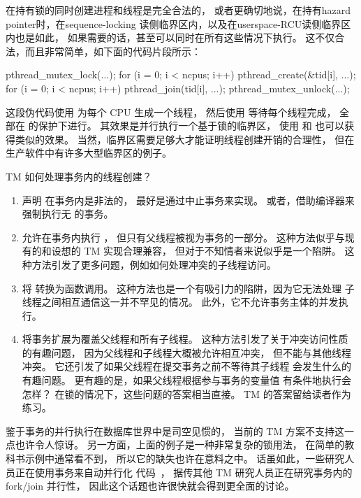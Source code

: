 在持有锁的同时创建进程和线程是完全合法的，
或者更确切地说，在持有hazard pointer时，在sequence-locking
读侧临界区内，以及在userspace-RCU读侧临界区内也是如此，
如果需要的话，甚至可以同时在所有这些情况下执行。
这不仅合法，而且非常简单，如下面的代码片段所示：

\begin{VerbatimN}
pthread_mutex_lock(...);
for (i = 0; i < ncpus; i++)
	pthread_create(&tid[i], ...);
for (i = 0; i < ncpus; i++)
	pthread_join(tid[i], ...);
pthread_mutex_unlock(...);
\end{VerbatimN}

这段伪代码使用  为每个 CPU 生成一个线程，
然后使用  等待每个线程完成，
全部在  的保护下进行。
其效果是并行执行一个基于锁的临界区，
使用  和  也可以获得类似的效果。
当然，临界区需要足够大才能证明线程创建开销的合理性，
但在生产软件中有许多大型临界区的例子。

TM 如何处理事务内的线程创建？

\begin{enumerate}
\item	声明  在事务内是非法的，
	最好是通过中止事务来实现。
	或者，借助编译器来强制执行无  的事务。
\item	允许在事务内执行 ，
	但只有父线程被视为事务的一部分。
	这种方法似乎与现有的和设想的 TM 实现合理兼容，
	但对于不知情者来说似乎是一个陷阱。
	这种方法引发了更多问题，例如如何处理冲突的子线程访问。
\item	将  转换为函数调用。
	这种方法也是一个有吸引力的陷阱，因为它无法处理
	子线程之间相互通信这一并不罕见的情况。
	此外，它不允许事务主体的并发执行。
\item	将事务扩展为覆盖父线程和所有子线程。
	这种方法引发了关于冲突访问性质的有趣问题，
	因为父线程和子线程大概被允许相互冲突，
	但不能与其他线程冲突。
	它还引发了如果父线程在提交事务之前不等待其子线程
	会发生什么的有趣问题。
	更有趣的是，如果父线程根据参与事务的变量值
	有条件地执行会怎样？
	在锁的情况下，这些问题的答案相当直接。
	TM 的答案留给读者作为练习。
\end{enumerate}

鉴于事务的并行执行在数据库世界中是司空见惯的，
当前的 TM 方案不支持这一点也许令人惊讶。
另一方面，上面的例子是一种非常复杂的锁用法，
在简单的教科书示例中通常看不到，
所以它的缺失也许在意料之中。
话虽如此，一些研究人员正在使用事务来自动并行化
代码~\cite{ArunRaman2010MultithreadedTransactions}，
据传其他 TM 研究人员正在研究事务内的 fork/join 并行性，
因此这个话题也许很快就会得到更全面的讨论。

